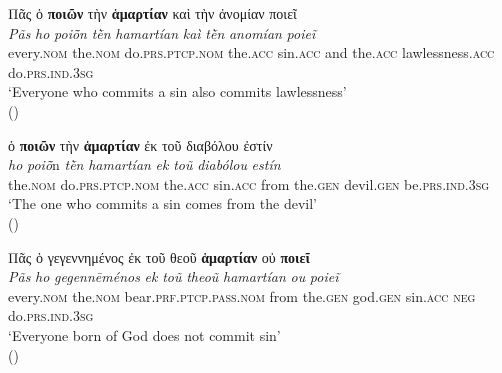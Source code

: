 \documentclass[output=paper,colorlinks,citecolor=brown]{langscibook}
\begin{document}
\ea\label{ex10CR} 
\glll Πᾶς ὁ \textbf{ποιῶν} τὴν \textbf{ἁμαρτίαν} καὶ τὴν ἀνομίαν ποιεῖ\\
\textit{Pãs} \textit{ho} \textit{poiō̃n} \textit{tḕn} \textit{hamartían} \textit{kaì} \textit{tḕn} \textit{anomían} \textit{poieĩ}\\
    every.\textsc{nom} the.\textsc{nom} do.\textsc{prs.ptcp.nom} the.\textsc{acc} sin.\textsc{acc} and the.\textsc{acc} lawlessness.\textsc{acc} do.\textsc{prs.ind.3sg} \\

\glt `Everyone who commits a sin also commits lawlessness' \\
\hspace*{\fill}()
\z

\ea\label{ex11CR} 
\glll ὁ \textbf{ποιῶν} τὴν \textbf{ἁμαρτίαν} ἐκ τοῦ διαβόλου ἐστίν\\
\textit{ho} \textit{poiō̃}n \textit{tḕn} \textit{hamartían} \textit{ek} \textit{toũ} \textit{diabólou} \textit{estín}\\ 
    the.\textsc{nom} do.\textsc{prs.ptcp.nom} the.\textsc{acc} sin.\textsc{acc} from the.\textsc{gen} devil.\textsc{gen} be.\textsc{prs.ind.3sg} \\

\glt `The one who commits a sin comes from the devil' \\
\hspace*{\fill}()
\z

\ea\label{ex12CR}  
\glll Πᾶς ὁ γεγεννημένος ἐκ τοῦ θεοῦ \textbf{ἁμαρτίαν} οὐ \textbf{ποιεῖ}\\
\textit{Pãs} \textit{ho} \textit{gegennēménos} \textit{ek} \textit{toũ} \textit{theoũ} \textit{hamartían} \textit{ou} \textit{poieĩ}\\
    every.\textsc{nom} the.\textsc{nom} bear.\textsc{prf.ptcp.pass.nom} from the.\textsc{gen} god.\textsc{gen} sin.\textsc{acc} \textsc{neg} do.\textsc{prs.ind.3sg} \\
\largerpage
\glt `Everyone born of God does not commit sin' \\
\hspace*{\fill}()
\z
\end{document}
